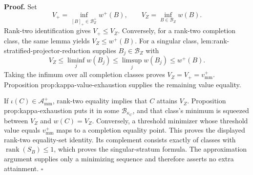 \textbf{Proof.}
Set
\[
 V_+=\inf_{[B]_+\in\mathcal B_Z^+}w^+(B),
 \qquad V_Z=\inf_{B\in\mathcal B_Z}w(B).
\]
Rank-two identification gives \(V_+\le V_Z\).  Conversely, for a rank-two completion class, the same lemma yields \(V_Z\le w^+(B)\).  For a singular class, lem:rank-stratified-projector-reduction supplies \(B_j\in\mathcal B_Z\) with
\[
V_Z\le\liminf_jw(B_j)\le\limsup_jw(B_j)\le w^+(B).
\]
Taking the infimum over all completion classes proves \(V_Z=V_+=v_{\mathrm{mm}}^+\).  Proposition prop:kappa-value-exhaustion supplies the remaining value equality.

If \(\iota(C)\in\mathcal A_{\mathrm{mm}}^+\), rank-two equality implies that \(C\) attains \(V_Z\).  Proposition prop:kappa-exhaustion puts it in some \(\mathcal B_{\kappa_C}\), and that class's minimum is squeezed between \(V_Z\) and \(w(C)=V_Z\).  Conversely, a threshold minimizer whose threshold value equals \(v_{\mathrm{mm}}^+\) maps to a completion equality point.  This proves the displayed rank-two equality-set identity.  Its complement consists exactly of classes with \(\operatorname{rank}(S_B)\le1\), which proves the singular-stratum formula.  The approximation argument supplies only a minimizing sequence and therefore asserts no extra attainment. \(\square\)